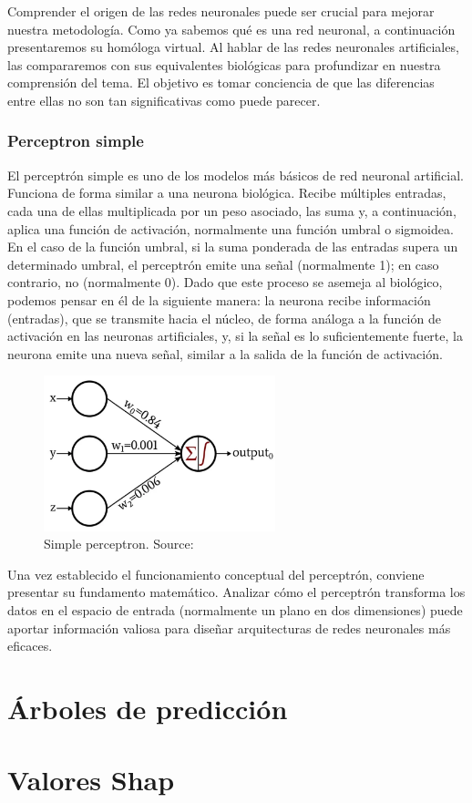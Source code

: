 Comprender el origen de las redes neuronales puede ser crucial para mejorar nuestra metodología. Como ya sabemos qué es una red neuronal, a continuación presentaremos su homóloga virtual. Al hablar de las redes neuronales artificiales, las compararemos con sus equivalentes biológicas para profundizar en nuestra comprensión del tema. El objetivo es tomar conciencia de que las diferencias entre ellas no son tan significativas como puede parecer.

\subsubsection{Perceptron simple}


El perceptrón simple es uno de los modelos más básicos de red neuronal artificial. Funciona de forma similar a una neurona biológica. Recibe múltiples entradas, cada una de ellas multiplicada por un peso asociado, las suma y, a continuación, aplica una función de activación, normalmente una función umbral o sigmoidea. En el caso de la función umbral, si la suma ponderada de las entradas supera un determinado umbral, el perceptrón emite una señal (normalmente 1); en caso contrario, no (normalmente 0).
Dado que este proceso se asemeja al biológico, podemos pensar en él de la siguiente manera: la neurona recibe información (entradas), que se transmite hacia el núcleo, de forma análoga a la función de activación en las neuronas artificiales, y, si la señal es lo suficientemente fuerte, la neurona emite una nueva señal, similar a la salida de la función de activación.

\begin{figure}[h!]
    \centering
    \includegraphics[width=0.6\textwidth]{figures/simple_perceptron.png}
    \caption{Simple perceptron. Source: \cite{simplePerceptron}}
    \label{fig:simplePerceptron}
\end{figure}

Una vez establecido el funcionamiento conceptual del perceptrón, conviene presentar su fundamento matemático. Analizar cómo el perceptrón transforma los datos en el espacio de entrada (normalmente un plano en dos dimensiones) puede aportar información valiosa para diseñar arquitecturas de redes neuronales más eficaces.

\section{Árboles de predicción}


\section{Valores Shap}